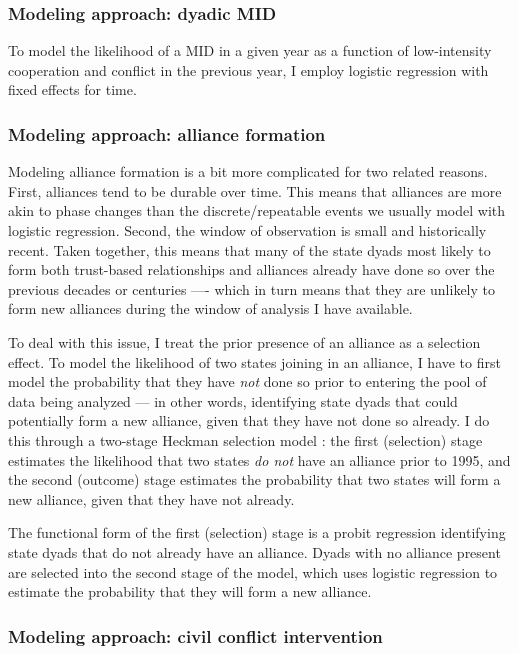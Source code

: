 \documentclass[10pt,]{article}
\begin{document}
\subsubsection{Modeling approach: dyadic
MID}\label{modeling-approach-dyadic-mid}

To model the likelihood of a MID in a given year as a function of
low-intensity cooperation and conflict in the previous year, I employ
logistic regression with fixed effects for time.

\subsubsection{Modeling approach: alliance
formation}\label{modeling-approach-alliance-formation}

Modeling alliance formation is a bit more complicated for two related
reasons. First, alliances tend to be durable over time. This means that
alliances are more akin to phase changes than the discrete/repeatable
events we usually model with logistic regression. Second, the window of
observation is small and historically recent. Taken together, this means
that many of the state dyads most likely to form both trust-based
relationships and alliances already have done so over the previous
decades or centuries ---- which in turn means that they are unlikely to
form new alliances during the window of analysis I have available.

To deal with this issue, I treat the prior presence of an alliance as a
selection effect. To model the likelihood of two states joining in an
alliance, I have to first model the probability that they have
\emph{not} done so prior to entering the pool of data being analyzed ---
in other words, identifying state dyads that could potentially form a
new alliance, given that they have not done so already. I do this
through a two-stage Heckman selection model \citep{Heckman1977}: the
first (selection) stage estimates the likelihood that two states
\emph{do not} have an alliance prior to 1995, and the second (outcome)
stage estimates the probability that two states will form a new
alliance, given that they have not already.

The functional form of the first (selection) stage is a probit
regression identifying state dyads that do not already have an alliance.
Dyads with no alliance present are selected into the second stage of the
model, which uses logistic regression to estimate the probability that
they will form a new alliance.

\subsubsection{Modeling approach: civil conflict
intervention}\label{modeling-approach-civil-conflict-intervention}
\end{document}
